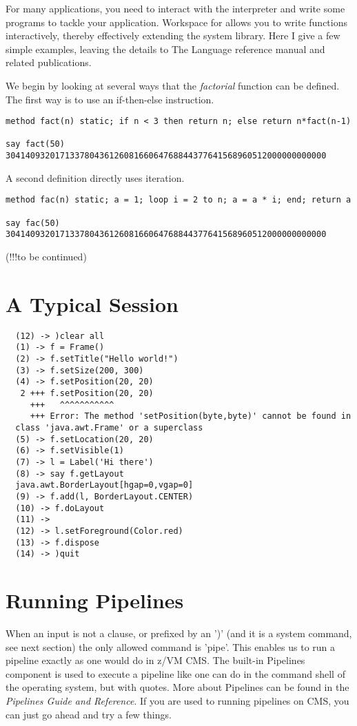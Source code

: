 For many applications, you need to interact with the interpreter and write some \nr{} programs to tackle your application. Workspace for \nr{} allows you to write functions interactively, thereby effectively extending the system library. Here I give a few simple examples, leaving the details to The \nr{} Language reference manual and related publications.

We begin by looking at several ways that the \emph{factorial} function can
be defined. The first way is to use an if-then-else instruction.
\begin{verbatim}
method fact(n) static; if n < 3 then return n; else return n*fact(n-1)

say fact(50)
30414093201713378043612608166064768844377641568960512000000000000
\end{verbatim}
A second definition directly uses iteration.
\begin{verbatim}
method fac(n) static; a = 1; loop i = 2 to n; a = a * i; end; return a

say fac(50)
30414093201713378043612608166064768844377641568960512000000000000
\end{verbatim}
(!!!to be continued)

 \section{A Typical Session}
\begin{verbatim}
  (12) -> )clear all
  (1) -> f = Frame()
  (2) -> f.setTitle("Hello world!")
  (3) -> f.setSize(200, 300)
  (4) -> f.setPosition(20, 20)
   2 +++ f.setPosition(20, 20)
     +++   ^^^^^^^^^^^
     +++ Error: The method 'setPosition(byte,byte)' cannot be found in
  class 'java.awt.Frame' or a superclass
  (5) -> f.setLocation(20, 20)
  (6) -> f.setVisible(1)
  (7) -> l = Label('Hi there')
  (8) -> say f.getLayout
  java.awt.BorderLayout[hgap=0,vgap=0]
  (9) -> f.add(l, BorderLayout.CENTER)
  (10) -> f.doLayout
  (11) ->
  (12) -> l.setForeground(Color.red)
  (13) -> f.dispose
  (14) -> )quit
\end{verbatim}

 \section{Running Pipelines}
 When an input is not a \nr{} clause, or prefixed by an ')' (and it is a system command,
 see next section) the only allowed command is 'pipe'. This enables us
 to run a pipeline exactly as one would do in z/VM CMS. The built-in
 \nr{} Pipelines component is used to execute a pipeline like one
 can do in the command shell of the operating system, but with
 quotes. More about Pipelines can be found in the \emph{Pipelines Guide and
 Reference}. If you are used to running pipelines on CMS, you can just go ahead and try a few things.

